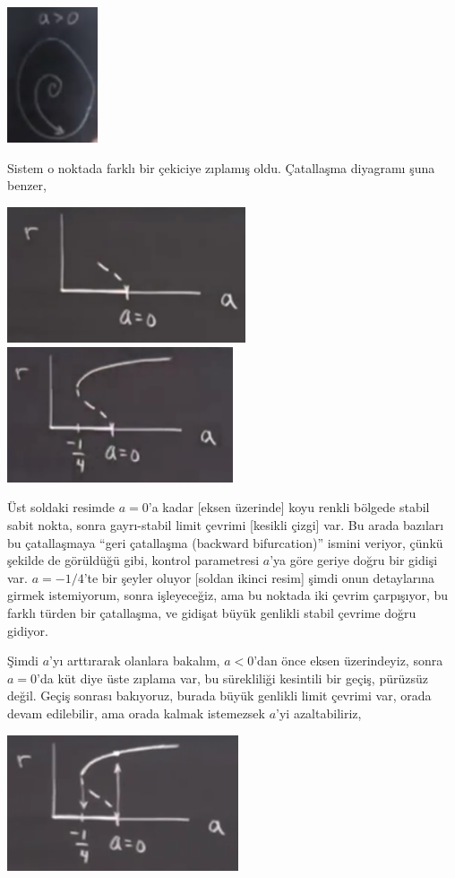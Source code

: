\documentclass[12pt,fleqn]{article}\usepackage{../../common}
\begin{document}
\includegraphics[height=4cm]{13_07.png}

Sistem o noktada farklı bir çekiciye zıplamış oldu. Çatallaşma diyagramı
şuna benzer,

\includegraphics[height=4cm]{13_08.png}
\includegraphics[height=4cm]{13_09.png}

Üst soldaki resimde $a=0$'a kadar [eksen üzerinde] koyu renkli bölgede
stabil sabit nokta, sonra gayrı-stabil limit çevrimi [kesikli çizgi]
var. Bu arada bazıları bu çatallaşmaya ``geri çatallaşma (backward
bifurcation)'' ismini veriyor, çünkü şekilde de görüldüğü gibi, kontrol
parametresi $a$'ya göre geriye doğru bir gidişi var. $a=-1/4$'te bir şeyler
oluyor [soldan ikinci resim] şimdi onun detaylarına girmek istemiyorum,
sonra işleyeceğiz, ama bu noktada iki çevrim çarpışıyor, bu farklı türden
bir çatallaşma, ve gidişat büyük genlikli stabil çevrime doğru gidiyor. 

Şimdi $a$'yı arttırarak olanlara bakalım, $a<0$'dan önce eksen üzerindeyiz,
sonra $a=0$'da küt diye üste zıplama var, bu sürekliliği kesintili bir
geçiş, pürüzsüz değil. Geçiş sonrası bakıyoruz, burada büyük genlikli limit
çevrimi var, orada devam edilebilir, ama orada kalmak istemezsek $a$'yi
azaltabiliriz,

\includegraphics[height=4cm]{13_10.png}
\end{document}
